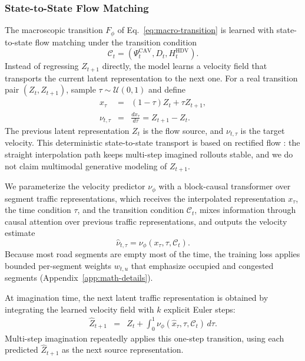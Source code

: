 \subsubsection{State-to-State Flow Matching}

The macroscopic transition \(F_\phi\) of Eq.~\ref{eq:macro-transition} is
learned with state-to-state flow
matching \cite{GiFlow} under the transition condition
\begin{equation}
\mathcal{C}_t=
(\Psi_t^{\mathrm{CAV}},D_t,H_t^{\mathrm{HDV}}).
\end{equation}
Instead of regressing \(Z_{t+1}\) directly, the model learns a velocity
field that transports the current latent representation to the next one.
For a real transition pair \((Z_t,Z_{t+1})\), sample
\(\tau\sim\mathcal{U}(0,1)\) and define
\begin{equation}
\begin{array}{rcl}
x_\tau &=& (1-\tau)Z_t+\tau Z_{t+1},\\
\nu_{t,\tau} &=& \frac{dx_\tau}{d\tau} = Z_{t+1}-Z_t.
\end{array}
\end{equation}
The previous latent representation \(Z_t\) is the flow source, and
\(\nu_{t,\tau}\) is the target velocity.  This deterministic state-to-state
transport is based on rectified flow \cite{lipman2023flow,liu2023rectified}:
the straight interpolation path keeps multi-step imagined rollouts stable,
and we do not claim multimodal generative modeling of \(Z_{t+1}\).

We parameterize the velocity predictor \(\nu_\phi\) with a block-causal
transformer \cite{vaswani2017attention} over segment traffic
representations, which receives the interpolated representation \(x_\tau\),
the time condition \(\tau\), and the transition condition \(\mathcal{C}_t\),
mixes information through causal attention over previous traffic
representations, and outputs the velocity estimate
\begin{equation}
\hat\nu_{t,\tau}=\nu_\phi(x_\tau,\tau,\mathcal{C}_t).
\end{equation}
Because most road segments are empty most of the time, the training loss
applies bounded per-segment weights \(w_{t,u}\) that emphasize occupied and
congested segments (Appendix~\ref{app:math-details}).

At imagination time, the next latent traffic representation is obtained by
integrating the learned velocity field with \(k\) explicit Euler steps:
\begin{equation}
\begin{array}{rcl}
\hat Z_{t+1}
&=&
\displaystyle
Z_t+\int_0^1
\nu_\phi(\hat x_\tau,\tau,\mathcal{C}_t)\,d\tau.
\end{array}
\end{equation}
Multi-step imagination repeatedly applies this one-step transition, using
each predicted \(\hat Z_{t+1}\) as the next source representation.


